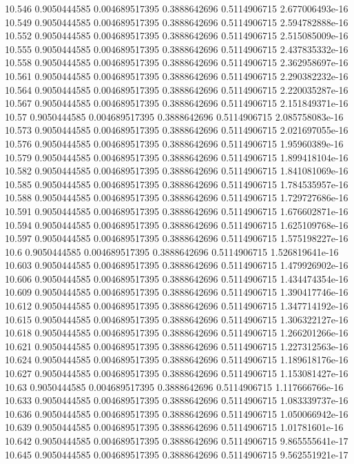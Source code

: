 {10.546 0.9050444585 0.004689517395 0.3888642696 0.5114906715 2.677006493e-16
10.549 0.9050444585 0.004689517395 0.3888642696 0.5114906715 2.594782888e-16
10.552 0.9050444585 0.004689517395 0.3888642696 0.5114906715 2.515085009e-16
10.555 0.9050444585 0.004689517395 0.3888642696 0.5114906715 2.437835332e-16
10.558 0.9050444585 0.004689517395 0.3888642696 0.5114906715 2.362958697e-16
10.561 0.9050444585 0.004689517395 0.3888642696 0.5114906715 2.290382232e-16
10.564 0.9050444585 0.004689517395 0.3888642696 0.5114906715 2.220035287e-16
10.567 0.9050444585 0.004689517395 0.3888642696 0.5114906715 2.151849371e-16
10.57 0.9050444585 0.004689517395 0.3888642696 0.5114906715 2.085758083e-16
10.573 0.9050444585 0.004689517395 0.3888642696 0.5114906715 2.021697055e-16
10.576 0.9050444585 0.004689517395 0.3888642696 0.5114906715 1.95960389e-16
10.579 0.9050444585 0.004689517395 0.3888642696 0.5114906715 1.899418104e-16
10.582 0.9050444585 0.004689517395 0.3888642696 0.5114906715 1.841081069e-16
10.585 0.9050444585 0.004689517395 0.3888642696 0.5114906715 1.784535957e-16
10.588 0.9050444585 0.004689517395 0.3888642696 0.5114906715 1.729727686e-16
10.591 0.9050444585 0.004689517395 0.3888642696 0.5114906715 1.676602871e-16
10.594 0.9050444585 0.004689517395 0.3888642696 0.5114906715 1.625109768e-16
10.597 0.9050444585 0.004689517395 0.3888642696 0.5114906715 1.575198227e-16
10.6 0.9050444585 0.004689517395 0.3888642696 0.5114906715 1.526819641e-16
10.603 0.9050444585 0.004689517395 0.3888642696 0.5114906715 1.479926902e-16
10.606 0.9050444585 0.004689517395 0.3888642696 0.5114906715 1.434474354e-16
10.609 0.9050444585 0.004689517395 0.3888642696 0.5114906715 1.390417746e-16
10.612 0.9050444585 0.004689517395 0.3888642696 0.5114906715 1.347714192e-16
10.615 0.9050444585 0.004689517395 0.3888642696 0.5114906715 1.306322127e-16
10.618 0.9050444585 0.004689517395 0.3888642696 0.5114906715 1.266201266e-16
10.621 0.9050444585 0.004689517395 0.3888642696 0.5114906715 1.227312563e-16
10.624 0.9050444585 0.004689517395 0.3888642696 0.5114906715 1.189618176e-16
10.627 0.9050444585 0.004689517395 0.3888642696 0.5114906715 1.153081427e-16
10.63 0.9050444585 0.004689517395 0.3888642696 0.5114906715 1.117666766e-16
10.633 0.9050444585 0.004689517395 0.3888642696 0.5114906715 1.083339737e-16
10.636 0.9050444585 0.004689517395 0.3888642696 0.5114906715 1.050066942e-16
10.639 0.9050444585 0.004689517395 0.3888642696 0.5114906715 1.01781601e-16
10.642 0.9050444585 0.004689517395 0.3888642696 0.5114906715 9.865555641e-17
10.645 0.9050444585 0.004689517395 0.3888642696 0.5114906715 9.562551921e-17
}
